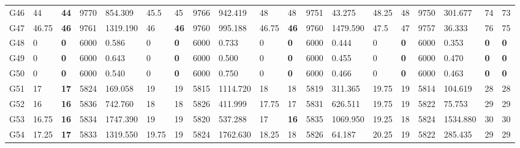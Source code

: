 \documentclass[12pt, a4paper]{article}%
\numberwithin{equation}{section}
\theoremstyle{plain}
\begin{document}
{\begin{landscape}
\begin{longtable}{lllllllllllllllllll}
							G46                       & 44     & \textbf{44}  & 9770  & 854.309  & 45.5   & 45           & 9766  & 942.419  & 48     & 48           & 9751  & 43.275   & 48.25  & 48           & 9750  & 301.677  & 74                      & 73                   \\
							G47                       & 46.75  & \textbf{46}  & 9761  & 1319.190 & 46     & \textbf{46}  & 9760  & 995.188  & 46.75  & \textbf{46}  & 9760  & 1479.590 & 47.5   & 47           & 9757  & 36.333   & 76                      & 75                   \\
							G48                       & 0      & \textbf{0}   & 6000  & 0.586    & 0      & \textbf{0}   & 6000  & 0.733    & 0      & \textbf{0}   & 6000  & 0.444    & 0      & \textbf{0}   & 6000  & 0.353    & \textbf{0}              & \textbf{0}           \\
							G49                       & 0      & \textbf{0}   & 6000  & 0.643    & 0      & \textbf{0}   & 6000  & 0.500    & 0      & \textbf{0}   & 6000  & 0.455    & 0      & \textbf{0}   & 6000  & 0.470    & \textbf{0}              & \textbf{0}           \\
							G50                       & 0      & \textbf{0}   & 6000  & 0.540    & 0      & \textbf{0}   & 6000  & 0.750    & 0      & \textbf{0}   & 6000  & 0.466    & 0      & \textbf{0}   & 6000  & 0.463    & \textbf{0}              & \textbf{0}           \\
							G51                       & 17     & \textbf{17}  & 5824  & 169.058  & 19     & 19           & 5815  & 1114.720 & 18     & 18           & 5819  & 311.365  & 19.75  & 19           & 5814  & 104.619  & 28                      & 28                   \\
							G52                       & 16     & \textbf{16}  & 5836  & 742.760  & 18     & 18           & 5826  & 411.999  & 17.75  & 17           & 5831  & 626.511  & 19.75  & 19           & 5822  & 75.753   & 29                      & 29                   \\
							G53                       & 16.75  & \textbf{16}  & 5834  & 1747.390 & 19     & 19           & 5820  & 537.288  & 17     & \textbf{16}  & 5835  & 1069.950 & 19.25  & 18           & 5824  & 1534.880 & 30                      & 30                   \\
							G54                       & 17.25  & \textbf{17}  & 5833  & 1319.550 & 19.75  & 19           & 5824  & 1762.630 & 18.25  & 18           & 5826  & 64.187   & 20.25  & 19           & 5822  & 285.435  & 29                      & 29                   \\

\end{longtable}
\end{landscape}}
\end{document}
